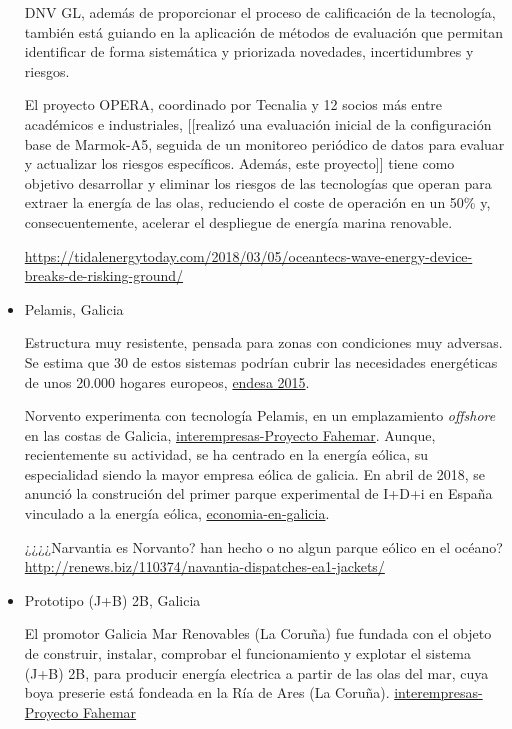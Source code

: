 \documentclass[]{article}
\begin{document}
\begin{itemize}
  DNV GL, además de proporcionar el proceso de calificación de la
  tecnología, también está guiando en la aplicación de métodos de
  evaluación que permitan identificar de forma sistemática y priorizada
  novedades, incertidumbres y riesgos.

  El proyecto OPERA, coordinado por Tecnalia y 12 socios más entre
  académicos e industriales, {[}{[}realizó una evaluación inicial de la
  configuración base de Marmok-A5, seguida de un monitoreo periódico de
  datos para evaluar y actualizar los riesgos específicos. Además, este
  proyecto{]}{]} tiene como objetivo desarrollar y eliminar los riesgos
  de las tecnologías que operan para extraer la energía de las olas,
  reduciendo el coste de operación en un 50\% y, consecuentemente,
  acelerar el despliegue de energía marina renovable.

  \url{https://tidalenergytoday.com/2018/03/05/oceantecs-wave-energy-device-breaks-de-risking-ground/}
\item
  Pelamis, Galicia

  Estructura muy resistente, pensada para zonas con condiciones muy
  adversas. Se estima que 30 de estos sistemas podrían cubrir las
  necesidades energéticas de unos 20.000 hogares europeos,
  \href{https://www.solucionesintegralesendesa.com/blog/equipamiento-hogar/ahorro-hogar/energia-undimotriz-el-poder-de-las-olas/}{endesa
  2015}.

  Norvento experimenta con tecnología Pelamis, en un emplazamiento
  \emph{offshore} en las costas de Galicia,
  \href{http://www.interempresas.net/Energia/Articulos/126331-Generar-energia-a-partir-de-energia-undimotriz.html}{interempresas-Proyecto
  Fahemar}. Aunque, recientemente su actividad, se ha centrado en la
  energía eólica, su especialidad siendo la mayor empresa eólica de
  galicia. En abril de 2018, se anunció la construción del primer parque
  experimental de I+D+i en España vinculado a la energía eólica,
  \href{http://www.economiaengalicia.com/articulo/empresa/norvento-construira-primer-parque-experimental-idi-espana-vinculado-energia-eolica/20170404180131003321.html}{economia-en-galicia}.

  ¿¿¿¿Narvantia es Norvanto? han hecho o no algun parque eólico en el
  océano?
  \url{http://renews.biz/110374/navantia-dispatches-ea1-jackets/}
\item
  Prototipo (J+B) 2B, Galicia

  El promotor Galicia Mar Renovables (La Coruña) fue fundada con el
  objeto de construir, instalar, comprobar el funcionamiento y explotar
  el sistema (J+B) 2B, para producir energía electrica a partir de las
  olas del mar, cuya boya preserie está fondeada en la Ría de Ares (La
  Coruña).
  \href{http://www.interempresas.net/Energia/Articulos/126331-Generar-energia-a-partir-de-energia-undimotriz.html}{interempresas-Proyecto
  Fahemar}


\end{itemize}
\end{document}
